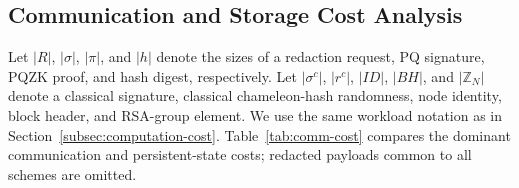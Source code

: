 \documentclass[lettersize,journal]{IEEEtran}
\begin{document}
\subsection{Communication and Storage Cost Analysis}
\label{subsec:communication-cost}

Let $|R|$, $|\sigma|$, $|\pi|$, and $|h|$ denote the sizes of a
redaction request, PQ signature, PQZK proof, and hash digest,
respectively. Let $|\sigma^{c}|$, $|r^{c}|$, $|ID|$, $|BH|$, and
$|\mathbb{Z}_N|$ denote a classical signature, classical
chameleon-hash randomness, node identity, block header, and RSA-group
element. We use the same workload notation as in
Section~\ref{subsec:computation-cost}. Table~\ref{tab:comm-cost}
compares the dominant communication and persistent-state costs;
redacted payloads common to all schemes are omitted.
\end{document}
